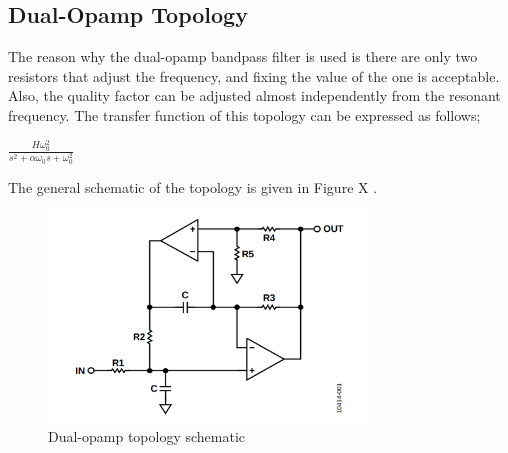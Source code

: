 \documentclass[letterpaper,12pt]{article}
\begin{document}
\subsection{Dual-Opamp Topology}
The reason why the dual-opamp bandpass filter is used is there are only two resistors that adjust the frequency, and fixing the value of the one is acceptable. Also, the quality factor can be adjusted almost independently from the resonant frequency. The transfer function of this topology can be expressed as follows;
\begin{center}
    $ \frac{H \omega_0^2 }{s^2 + \alpha \omega_0 s + \omega_0 ^2} $
    
\end{center}
The general schematic of the topology is given in Figure X .
\begin{figure}[H]
    \centering
    \includegraphics[width = 0.75\textwidth]{dualopamp.png}
    \caption{Dual-opamp topology schematic}
\end{figure} 
\end{document}
